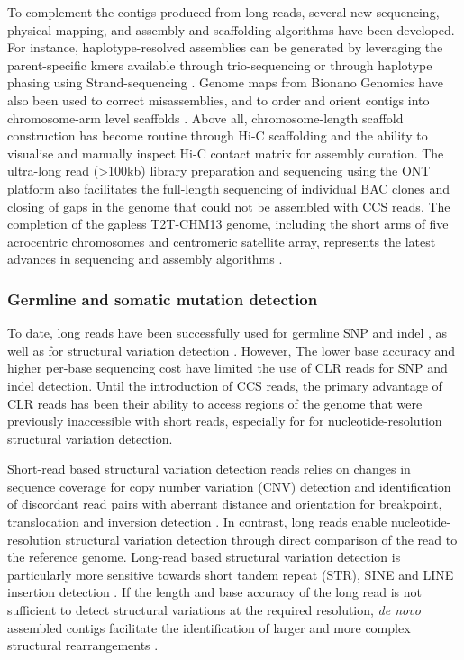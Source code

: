 To complement the contigs produced from long reads, several new sequencing, physical mapping, and assembly and scaffolding algorithms have been developed. For instance, haplotype-resolved assemblies can be generated by leveraging the parent-specific kmers available through trio-sequencing \cite{Koren2018-wg} or through haplotype phasing using Strand-sequencing \cite{Porubsky2021-ct}.  Genome maps from Bionano Genomics have also been used to correct misassemblies, and to order and orient contigs into chromosome-arm level scaffolds \cite{Pendleton2015-ue}. Above all, chromosome-length scaffold construction has become routine through Hi-C scaffolding and the ability to visualise \cite{Robinson2018-os} and manually inspect Hi-C contact matrix for assembly curation\cite{Dudchenko2018-yl}. The ultra-long read (>100kb) library preparation and sequencing using the ONT platform \cite{Jain2018-zh} also facilitates the full-length sequencing of individual BAC clones \cite{Jain2018-mg} and closing of gaps in the genome that could not be assembled with CCS reads. The completion of the gapless T2T-CHM13 genome, including the short arms of five acrocentric chromosomes and centromeric satellite array, represents the latest advances in sequencing and assembly algorithms \cite{Nurk2022-dv}. 

\subsubsection{Germline and somatic mutation detection}

To date, long reads have been successfully used for germline SNP and indel \cite{Poplin2018-ub}, as well as for structural variation detection \cite{Chaisson2015-zz}. However, The lower base accuracy and higher per-base sequencing cost have limited the use of CLR reads for SNP and indel detection. Until the introduction of CCS reads, the primary advantage of CLR reads has been their ability to access regions of the genome that were previously inaccessible with short reads, especially for for nucleotide-resolution structural variation detection. 

Short-read based structural variation detection reads relies on changes in sequence coverage for copy number variation (CNV) detection \cite{Abyzov2011-xl} and identification of discordant read pairs with aberrant distance and orientation for breakpoint, translocation and inversion detection \cite{Alkan2011-dv}. In contrast, long reads enable nucleotide-resolution structural variation detection through direct comparison of the read to the reference genome. Long-read based structural variation detection is particularly more sensitive towards short tandem repeat (STR), SINE and LINE insertion detection \cite{Chaisson2015-zz, Sedlazeck2018-oh, Denti2022-ux}. If the length and base accuracy of the long read is not sufficient to detect structural variations at the required resolution, \textit{de novo} assembled contigs facilitate the identification of larger and more complex structural rearrangements \cite{Nattestad2016-og}.

